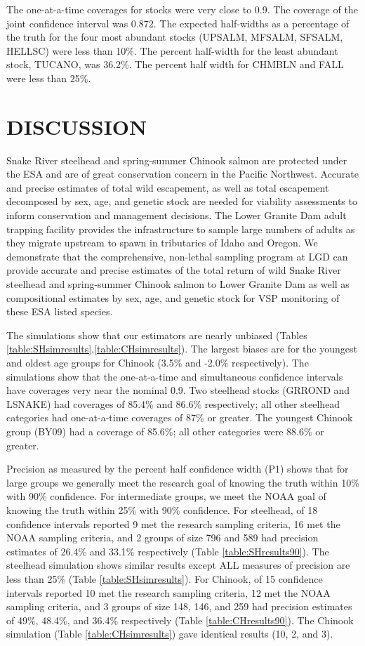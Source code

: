 \documentclass[11pt]{article}
\begin{document}
The one-at-a-time coverages for stocks were very close to 0.9. The coverage of the joint confidence interval was 0.872. The expected half-widths as a percentage of the truth for the four most abundant stocks (UPSALM, MFSALM, SFSALM, HELLSC) were less than 10\%. The percent half-width for the least abundant stock, TUCANO, was 36.2\%. The percent half width for CHMBLN and FALL were less than 25\%.

\section{DISCUSSION}	

Snake River steelhead and spring-summer Chinook salmon are protected under the ESA and are of great conservation concern in the Pacific Northwest. Accurate and precise estimates of total wild escapement, as well as total escapement decomposed by sex, age, and genetic stock are needed for viability assessments to inform conservation and management decisions. The Lower Granite Dam adult trapping facility provides the infrastructure to sample large numbers of adults as they migrate upstream to spawn in tributaries of Idaho and Oregon. We demonstrate that the comprehensive, non-lethal sampling program at LGD can provide accurate and precise estimates of the total return of wild Snake River steelhead and spring-summer Chinook salmon to Lower Granite Dam as well as compositional estimates by sex, age, and genetic stock for VSP monitoring of these ESA listed species.

The simulations show that our estimators are nearly unbiased (Tables \ref{table:SHsimresults},\ref{table:CHsimresults}).  The largest biases are for the youngest and oldest age groups for Chinook (3.5\% and -2.0\% respectively).  The simulations show that the one-at-a-time and simultaneous confidence intervals have coverages very near the nominal 0.9.  Two steelhead stocks (GRROND and LSNAKE) had coverages of 85.4\% and 86.6\% respectively; all other steelhead categories had one-at-a-time coverages of 87\% or greater.  The youngest Chinook group (BY09) had a coverage of 85.6\%; all other categories were 88.6\% or greater.

Precision as measured by the percent half confidence width (P1) shows that for large groups we generally meet the research goal of knowing the truth within 10\% with 90\% confidence.  For intermediate groups, we meet the NOAA goal of knowing the truth within 25\% with 90\% confidence.  For steelhead, of 18 confidence intervals reported 9 met the research sampling criteria, 16 met the NOAA sampling criteria, and 2 groups of size 796 and 589 had precision estimates of 26.4\% and 33.1\% respectively (Table \ref{table:SHresults90}). The steelhead simulation shows similar results except ALL measures of precision are less than 25\% (Table \ref{table:SHsimresults}). For Chinook, of 15 confidence intervals reported 10 met the research sampling criteria, 12 met the NOAA sampling criteria, and 3 groups of size 148, 146, and 259 had precision estimates of 49\%, 48.4\%, and 36.4\% respectively (Table \ref{table:CHresults90}).  The Chinook simulation (Table \ref{table:CHsimresults}) gave identical results (10, 2, and 3).
\end{document}
